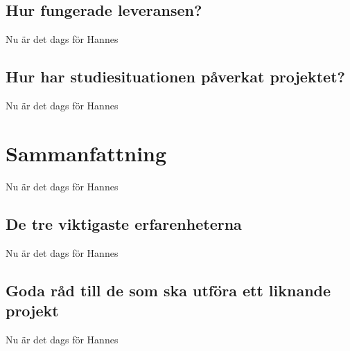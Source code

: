 \documentclass[a4paper,titlepage,12pt]{article}
\begin{document}
	\subsection{Hur fungerade leveransen?}
	Nu är det dags för Hannes
	
	\subsection{Hur har studiesituationen påverkat projektet?}
	Nu är det dags för Hannes
	
	\section{Sammanfattning}
	Nu är det dags för Hannes
	
	\subsection{De tre viktigaste erfarenheterna}
	Nu är det dags för Hannes
	
	\subsection{Goda råd till de som ska utföra ett liknande projekt}
	Nu är det dags för Hannes
	
\end{document}
